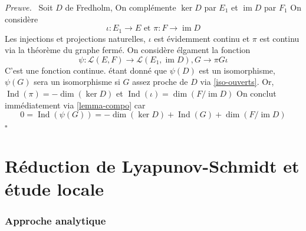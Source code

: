 \documentclass[a4paper,12pt,oneside,titlepage]{article}
\newcommand{\im}[0]{\operatorname{im}}
\theoremstyle{definition}
\theoremstyle{plain}
\newenvironment{preuve}
{\par\noindent\textit{Preuve.}\ }
{\hfill$\square$\par}
\begin{document}
\begin{preuve}
    Soit $D$ de Fredholm,
    On complémente $\ker D$ par $E_1$ et $\im D$ par $F_1$
    On considère
    \begin{equation*}
        \iota: E_1\rightarrow E\text{ et }\pi: F\rightarrow \im D
    \end{equation*}
    Les injections et projections naturelles, $\iota$ est évidemment continu et $\pi$ est continu via la théorème du graphe fermé. On considère élgament la fonction
    \begin{equation*}
        \psi : \mathcal{L}(E,F)\rightarrow \mathcal{L}(E_1,\im D), G\rightarrow \pi G\iota 
    \end{equation*}
    C'est une fonction continue. étant donné que $\psi(D)$ est un isomorphisme, $\psi(G)$ sera un isomorphisme si $G$ assez proche de $D$ via \ref{iso-ouverts}. Or, $\operatorname{Ind}(\pi)=-\dim (\ker D)$ et $\operatorname{Ind}(\iota)=\dim (F/\im D)$
    On conclut immédiatement via \ref{lemma-compo} car 
    \begin{equation*}
        0=\operatorname{Ind}(\psi(G))= -\dim(\ker D)+\operatorname{Ind}(G)+\dim(F/\im D)
    \end{equation*} 
\end{preuve}





\newpage


\part{Réduction de Lyapunov-Schmidt et étude locale}

\section{Approche analytique}
\end{document}
